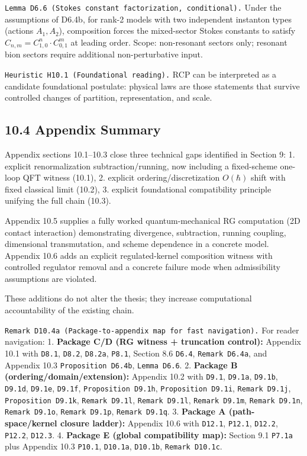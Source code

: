 \documentclass[
]{article}
\begin{document}
\texttt{Lemma\ D6.6\ (Stokes\ constant\ factorization,\ conditional).}
Under the assumptions of D6.4b, for rank-2 models with two independent
instanton types (actions \(A_1, A_2\)), composition forces the
mixed-sector Stokes constants to satisfy
\(C_{n,m} = C_{1,0}^n \cdot C_{0,1}^m\) at leading order. Scope:
non-resonant sectors only; resonant bion sectors require additional
non-perturbative input.

\texttt{Heuristic\ H10.1\ (Foundational\ reading).} RCP can be
interpreted as a candidate foundational postulate: physical laws are
those statements that survive controlled changes of partition,
representation, and scale.

\subsection{10.4 Appendix Summary}\label{appendix-summary}

Appendix sections 10.1--10.3 close three technical gaps identified in
Section 9: 1. explicit renormalization subtraction/running, now
including a fixed-scheme one-loop QFT witness (10.1), 2. explicit
ordering/discretization \(O(\hbar)\) shift with fixed classical limit
(10.2), 3. explicit foundational compatibility principle unifying the
full chain (10.3).

Appendix 10.5 supplies a fully worked quantum-mechanical RG computation
(2D contact interaction) demonstrating divergence, subtraction, running
coupling, dimensional transmutation, and scheme dependence in a concrete
model. Appendix 10.6 adds an explicit regulated-kernel composition
witness with controlled regulator removal and a concrete failure mode
when admissibility assumptions are violated.

These additions do not alter the thesis; they increase computational
accountability of the existing chain.

\texttt{Remark\ D10.4a\ (Package-to-appendix\ map\ for\ fast\ navigation).}
For reader navigation: 1. \textbf{Package C/D (RG witness + truncation
control):} Appendix 10.1 with \texttt{D8.1}, \texttt{D8.2},
\texttt{D8.2a}, \texttt{P8.1}, Section 8.6 \texttt{D6.4},
\texttt{Remark\ D6.4a}, and Appendix 10.3 \texttt{Proposition\ D6.4b},
\texttt{Lemma\ D6.6}. 2. \textbf{Package B (ordering/domain/extension):}
Appendix 10.2 with \texttt{D9.1}, \texttt{D9.1a}, \texttt{D9.1b},
\texttt{D9.1d}, \texttt{D9.1e}, \texttt{D9.1f},
\texttt{Proposition\ D9.1h}, \texttt{Proposition\ D9.1i},
\texttt{Remark\ D9.1j}, \texttt{Proposition\ D9.1k},
\texttt{Remark\ D9.1l}, \texttt{Remark\ D9.1l\textquotesingle{}},
\texttt{Remark\ D9.1m}, \texttt{Remark\ D9.1n}, \texttt{Remark\ D9.1o},
\texttt{Remark\ D9.1p}, \texttt{Remark\ D9.1q}. 3. \textbf{Package A
(path-space/kernel closure ladder):} Appendix 10.6 with \texttt{D12.1},
\texttt{P12.1}, \texttt{D12.2}, \texttt{P12.2}, \texttt{D12.3}. 4.
\textbf{Package E (global compatibility map):} Section 9.1
\texttt{P7.1a} plus Appendix 10.3 \texttt{P10.1}, \texttt{D10.1a},
\texttt{D10.1b}, \texttt{Remark\ D10.1c}.
\end{document}
